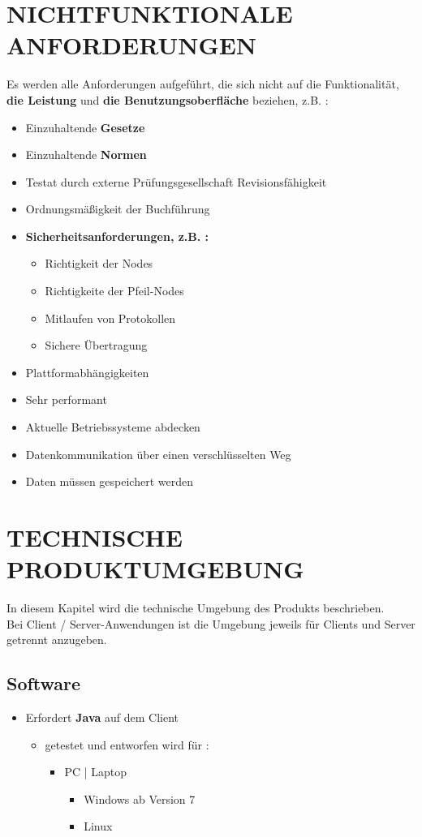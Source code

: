 	
	\section{\Large NICHTFUNKTIONALE ANFORDERUNGEN}
	Es werden alle Anforderungen aufgeführt, die sich nicht auf die Funktionalität, \textbf{ die Leistung} und \textbf{ die Benutzungsoberfläche} beziehen, z.B. :
	\begin{itemize}
		\item Einzuhaltende \textbf{Gesetze}
		\item Einzuhaltende \textbf{Normen}
		\item Testat durch externe Prüfungsgesellschaft
		Revisionsfähigkeit 
		\item Ordnungsmäßigkeit der Buchführung
		\item \textbf{ Sicherheitsanforderungen, z.B. :}
		\begin{itemize}
			\item Richtigkeit der Nodes
			\item Richtigkeite der Pfeil-Nodes
			\item Mitlaufen von Protokollen
			\item Sichere Übertragung
		\end{itemize}  
		\item Plattformabhängigkeiten
		\item Sehr performant
		\item Aktuelle Betriebssysteme abdecken
		\item Datenkommunikation über einen verschlüsselten Weg
		\item Daten müssen gespeichert werden	 
	\end{itemize} 

	
	\section{\Large TECHNISCHE PRODUKTUMGEBUNG}
   	In diesem Kapitel wird die technische Umgebung des Produkts beschrieben.\\
   	Bei Client / Server-Anwendungen ist die Umgebung jeweils für Clients und Server getrennt anzugeben.
	\subsection{Software}
	\begin{itemize}
		\item Erfordert \textbf{Java} auf dem Client
		\begin{itemize}
			\item getestet und entworfen wird für :
			\begin{itemize}
				\item PC | Laptop
				\begin{itemize}
					\item Windows ab Version 7
					\item Linux
				\end{itemize}
			\end{itemize}
		\end{itemize}
	\end{itemize}
